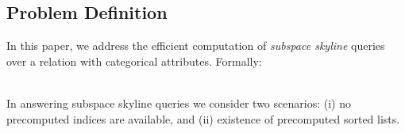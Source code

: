 \subsection{Problem Definition}
In this paper, we address the efficient computation of {\em subspace skyline} queries over a relation with categorical attributes.
Formally:

\medskip\noindent
 \\

In answering subspace skyline queries we consider two scenarios: (i) no precomputed indices are available, and (ii) existence of precomputed sorted lists.


